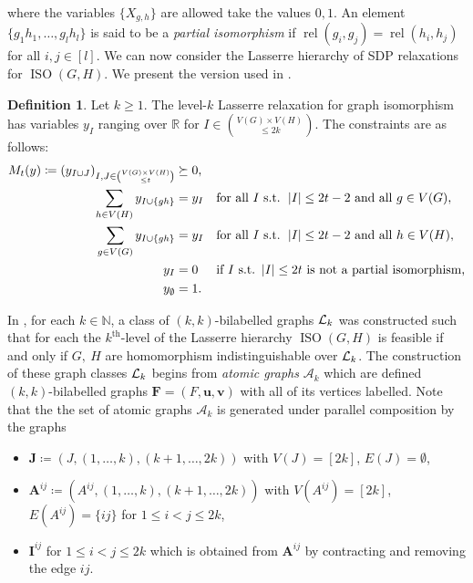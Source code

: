 \documentclass[a4paper,onecolumn,11pt,accepted=2026-01-06]{quantumarticle}
\theoremstyle{plain}
\theoremstyle{remark}
\theoremstyle{definition}
\newtheorem{definition}[thm]{Definition}
\DeclareMathOperator{\rel}{rel}
\DeclareMathOperator{\iso}{ISO}
\newcommand{\card}[1]{\left\lvert #1 \right\rvert}
\def\calA{{\mathcal A}} \def\calB{{\mathcal B}} \def\calC{{\mathcal C}}
\begin{document}
where the variables $\{X_{g,h}\}$ are allowed take the values $0,1$. An element $\{g_1h_1, \dots , g_lh_l\}$ is said to be a \emph{partial isomorphism} if $\rel(g_i, g_j) = \rel(h_i, h_j)$ for all $i, j \in [l]$.  We can now consider the Lasserre hierarchy of SDP relaxations for $\iso(G,H)$. We present the version used in \cite{roberson-seppelt-arxiv}. 

\begin{definition}
    Let $k \geq 1$. The level-$k$ Lasserre relaxation for graph isomorphism has variables $y_I$ ranging over $\mathbb{R}$ for $I \in \binom{V(G)\times V(H)} {\leq 2k} $. The constraints are as follows: 
    \begin{align}
        \begin{aligned}
            M_t(y) \coloneqq (y_{I \cup J})_{I, J \in \binom{V(G) \times V(H)}{\leq t}}  &\succeq 0,&& \\
			\sum_{h \in V(H)} y_{I \cup \{gh\}} &= y_{I} &&\text{for all } I \text{ s.t. } \card{I} \leq 2t-2 \text{ and all } g \in V(G), \\
			\sum_{g \in V(G)} y_{I \cup \{gh\}} &= y_{I} && \text{for all } I \text{ s.t. } \card{I} \leq 2t-2 \text{ and all } h \in V(H),  \\
			y_I & = 0 && \text{if } I \text{ s.t.\@ } \card{I} \leq 2t \text{ is not a partial isomorphism,}\\
			y_{\emptyset}& = 1. && \label{lassere5}
        \end{aligned}
    \end{align}
\end{definition}

In \cite{roberson-seppelt-arxiv}, for each $k \in \mathbb{N}$, a class of $(k,k)$-bilabelled graphs ${\mathcal L}_k$ was constructed such that for each the $k^{\text{th}}$-level of the Lasserre hierarchy $\iso(G,H)$ is feasible if and only if $G,\ H$ are homomorphism indistinguishable over ${\mathcal L}_k$. The construction of these graph classes ${\mathcal L}_k$ begins from \emph{atomic graphs} $\calA_k$ which are defined $(k,k)$-bilabelled graphs $\boldsymbol{F} = (F, \boldsymbol{u}, \boldsymbol{v})$ with all of its vertices labelled. Note that the the set of atomic graphs $\mathcal{A}_k$ is generated under parallel composition by the graphs
		\begin{itemize}
			\item $\boldsymbol{J} \coloneqq (J, (1,\dots, k), (k+1, \dots, 2k))$ with $V(J) = [2k]$, $E(J) = \emptyset$,
			\item $\boldsymbol{A}^{ij} \coloneqq (A^{ij}, (1,\dots, k), (k+1, \dots, 2k))$ with $V(A^{ij}) = [2k]$, $E(A^{ij}) = \{ij\}$ for $1 \leq i < j \leq 2k$,
			\item $\boldsymbol{I}^{ij}$ for $1 \leq i < j \leq 2k$ which is obtained from $\boldsymbol{A}^{ij}$ by contracting and removing the edge $ij$. 
		\end{itemize}
\end{document}
